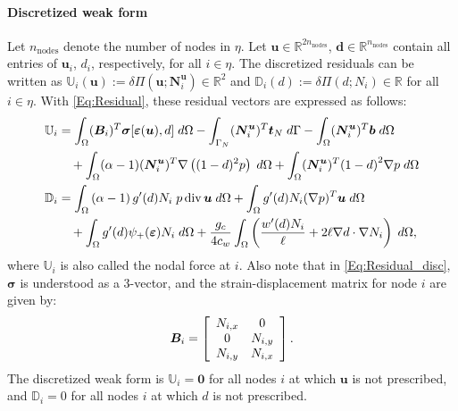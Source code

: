 \paragraph{Discretized weak form} {Let $n_\text{nodes}$ denote the number of nodes in $\eta$.
	Let $\mathbf{u}\in\mathbb{R}^{2n_\text{nodes}}$, $\mathbf{d}\in\mathbb{R}^{n_\text{nodes}}$ contain all entries of $\mathbf{u}_i$, ${d}_i$, respectively, for all $i\in\eta$. The discretized residuals can be written as $\mathbb{U}_i (\mathbf{u}):= \delta \Pi (\bm{u}; \bm{N}_i^{\bm{u}})\in\mathbb{R}^2$ and $\mathbb{D}_i({d}):=\delta\Pi ({d}; {N}_i)\in\mathbb{R}$ for all $i\in\eta$. %
With \eqref{Eq:Residual}, these residual vectors are expressed as follows:}
\begin{equation}\label{Eq:Residual_disc}
	\begin{aligned}
		\mathbb{U}_i & = \int_\Omega (\bm{B}_i)^T \bm{\sigma}[\bm{\varepsilon}(\bm{u}), d] \;d\Omega - \int_{\Gamma_N} (\bm{N}^{\bm{u}}_{i})^T\bm{t}_N \; d\Gamma - \int_\Omega (\bm{N}^{\bm{u}}_{i})^T\bm{b} \; d\Omega\\ &\quad +\int_{\Omega} (\alpha-1)(\bm{N}^{\bm{u}}_{i})^T \nabla\left((1-d)^2 {p}\right) \; d\Omega +\int_{\Omega}  (\bm{N}^{\bm{u}}_{i})^T {\left(1 - d\right)}^2\nabla {p} \; d\Omega\\
	    \mathbb{D}_i &= \int_{\Omega} \left(\alpha-1\right)g'(d)N_i \;{p} \operatorname{div} \bm{u} \; d\Omega + \int_{\Omega} g'(d) N_i (\nabla {p})^T  \bm{u} \; d\Omega \\
	    & \quad+\int_\Omega g'(d) \psi_+(\bm{\varepsilon}) N_i \; d\Omega + \frac{g_c}{4c_w} \int_\Omega  \left(\frac{w'(d) N_i}{\ell} + 2\ell \nabla d \cdot \nabla N_i \right)\;d\Omega,
	\end{aligned}
\end{equation}
{where $\mathbb{U}_i$ is also called the nodal force at $i$. %
Also note that in \eqref{Eq:Residual_disc}, $\bm{\sigma}$ is understood as a 3-vector, %
and the strain-displacement matrix for node $i$ are given by:}
\begin{equation*}
    \bm{B}_i=\left[
	\begin{array}{c c}
 	N_{i,x} &  0\\
 	0 & N_{i,y} \\
 	N_{i,y} & N_{i,x} \\
 	\end{array}
 	\right].
\end{equation*}
{The discretized weak form is $\mathbb{U}_i=\mathbf{0}$ for all nodes $i$ at which $\bm{u}$ is not prescribed, and $\mathbb{D}_i=0$ for all nodes $i$ at which $d$ is not prescribed.
}
%
